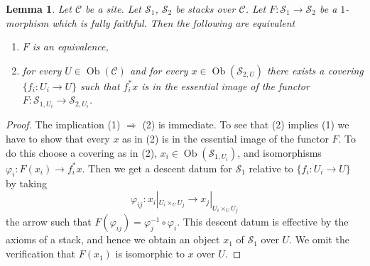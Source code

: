 \documentclass{stacks-project}
\theoremstyle{plain}
\newtheorem{lemma}[subsection]{Lemma}
\theoremstyle{definition}
\theoremstyle{remark}
\numberwithin{equation}{subsection}
\def\Ob{\mathop{\mathrm{Ob}}\nolimits}
\begin{document}
\begin{lemma}
\label{lemma-characterize-essentially-surjective-when-ff}
Let $\mathcal{C}$ be a site.
Let $\mathcal{S}_1$, $\mathcal{S}_2$ be stacks over $\mathcal{C}$.
Let $F : \mathcal{S}_1 \to \mathcal{S}_2$ be a $1$-morphism which is
fully faithful. Then the following are equivalent
\begin{enumerate}
\item $F$ is an equivalence,
\item for every $U \in \Ob(\mathcal{C})$ and for every
$x \in \Ob(\mathcal{S}_{2, U})$ there exists a covering
$\{f_i : U_i \to U\}$ such that $f_i^*x$ is in the essential image
of the functor $F : \mathcal{S}_{1, U_i} \to \mathcal{S}_{2, U_i}$.
\end{enumerate}
\end{lemma}

\begin{proof}
The implication (1) $\Rightarrow$ (2) is immediate.
To see that (2) implies (1) we have to show that every
$x$ as in (2) is in the essential image of the functor $F$.
To do this choose a covering as in (2),
$x_i \in \Ob(\mathcal{S}_{1, U_i})$, and
isomorphisms $\varphi_i : F(x_i) \to f_i^*x$. Then we get a descent
datum for $\mathcal{S}_1$ relative to $\{f_i : U_i \to U\}$
by taking
$$
\varphi_{ij} :
x_i|_{U_i \times_U U_j}
\longrightarrow
x_j|_{U_i \times_U U_j}
$$
the arrow such that $F(\varphi_{ij}) = \varphi_j^{-1} \circ \varphi_i$.
This descent datum is effective by the axioms of a stack, and hence
we obtain an object $x_1$ of $\mathcal{S}_1$ over $U$. We omit the
verification that $F(x_1)$ is isomorphic to $x$ over $U$.
\end{proof}
\end{document}
